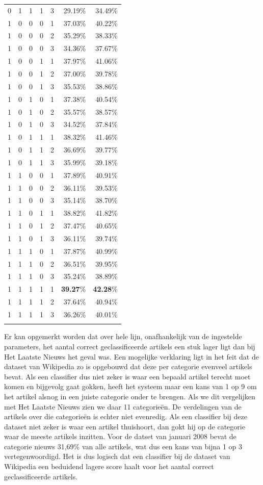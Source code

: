 \begin{longtable}{rrrrrrr}
0	& 1	& 1	& 1	& 3	& 29.19\%	& 34.49\% \\
1	& 0	& 0	& 0	& 1	& 37.03\%	& 40.22\% \\
1	& 0	& 0	& 0	& 2	& 35.29\%	& 38.33\% \\
1	& 0	& 0	& 0	& 3	& 34.36\%	& 37.67\% \\
1	& 0	& 0	& 1	& 1	& 37.97\%	& 41.06\% \\
1	& 0	& 0	& 1	& 2	& 37.00\%	& 39.78\% \\
1	& 0	& 0	& 1	& 3	& 35.53\%	& 38.86\% \\
1	& 0	& 1	& 0	& 1	& 37.38\%	& 40.54\% \\
1	& 0	& 1	& 0	& 2	& 35.57\%	& 38.57\% \\
1	& 0	& 1	& 0	& 3	& 34.52\%	& 37.84\% \\
1	& 0	& 1	& 1	& 1	& 38.32\%	& 41.46\% \\
1	& 0	& 1	& 1	& 2	& 36.69\%	& 39.77\% \\
1	& 0	& 1	& 1	& 3	& 35.99\%	& 39.18\% \\
1	& 1	& 0	& 0	& 1	& 37.89\%	& 40.91\% \\
1	& 1	& 0	& 0	& 2	& 36.11\%	& 39.53\% \\
1	& 1	& 0	& 0	& 3	& 35.14\%	& 38.70\% \\
1	& 1	& 0	& 1	& 1	& 38.82\%	& 41.82\% \\
1	& 1	& 0	& 1	& 2	& 37.47\%	& 40.65\% \\
1	& 1	& 0	& 1	& 3	& 36.11\%	& 39.74\% \\
1	& 1	& 1	& 0	& 1	& 37.87\%	& 40.99\% \\
1	& 1	& 1	& 0	& 2	& 36.51\%	& 39.95\% \\
1	& 1	& 1	& 0	& 3	& 35.24\%	& 38.89\% \\
1	& 1	& 1	& 1	& 1	& \textbf{39.27}\%	& \textbf{42.28}\% \\
1	& 1	& 1 & 1	& 2	& 37.64\%	& 40.94\% \\
1	& 1	& 1	& 1	& 3	& 36.26\%	& 40.01\% \\
	\bottomrule
	\label{tab:preprocessing-wiki}
\end{longtable}%

Er kan opgemerkt worden dat over hele lijn, onafhankelijk van de ingestelde parameters, het aantal correct geclassificeerde artikels een stuk lager ligt dan bij Het Laatste Nieuws het geval was. Een mogelijke verklaring ligt in het feit dat de dataset van Wikipedia zo is opgebouwd dat deze per categorie evenveel artikels bevat. Als een classifier dus niet zeker is waar een bepaald artikel terecht moet komen en bijgevolg gaat gokken, heeft het systeem maar een kans van 1 op 9 om het artikel alsnog in een juiste categorie onder te brengen. Als we dit vergelijken met Het Laatste Nieuws zien we daar 11 categorie\"en. De verdelingen van de artikels over die categorie\"en is echter niet evenredig. Als een classifier bij deze dataset niet zeker is waar een artikel thuishoort, dan gokt hij op de categorie waar de meeste artikels inzitten. Voor de datset van januari 2008 bevat de categorie nieuws 31,69\% van alle artikels, wat dus een kans van bijna 1 op 3 vertegenwoordigd. Het is dus logisch dat een classifier bij de dataset van Wikipedia een beduidend lagere score haalt voor het aantal correct geclassificeerde artikels.

